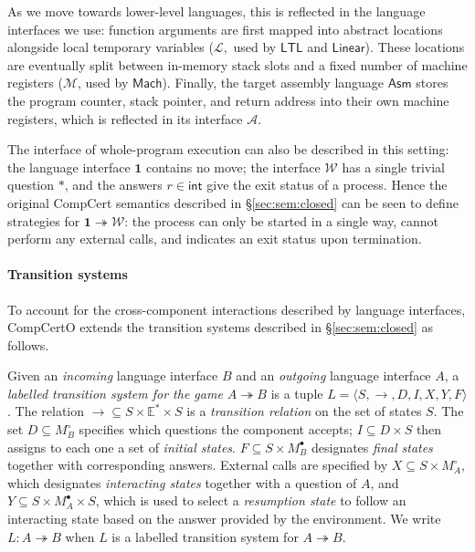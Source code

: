 \documentclass[acmsmall,authordraft]{acmart}
\newcommand{\kw}[1]{\ensuremath{ \mathsf{#1} }}
\newcommand{\que}{\circ}
\newcommand{\ans}{\bullet}
\begin{document}
As we move towards lower-level languages,
this is reflected in the language interfaces we use:
function arguments are first mapped into
abstract locations alongside local temporary variables
($\mathcal{L}$,~used by \kw{LTL} and \kw{Linear}).
These locations are eventually split between
in-memory stack slots and a fixed number of machine registers
($\mathcal{M}$, used by \kw{Mach}).
Finally, the target assembly language \kw{Asm}
stores the program counter, stack pointer,
and return address into their own machine registers,
which is reflected in its interface $\mathcal{A}$.

The interface of whole-program execution
can also be described in this setting:
the language interface $\mathbf{1}$ contains no move;
the interface $\mathcal{W}$ has a single trivial question $*$,
and the answers $r \in \kw{int}$
give the exit status of a process.
Hence the original CompCert semantics described in
\S\ref{sec:sem:closed}
can be seen to define strategies for
$\mathbf{1} \twoheadrightarrow \mathcal{W}$:
the process can only be started in a single way,
cannot perform any external calls,
and indicates an exit status upon termination.


\paragraph{Transition systems} %

To account for the cross-component interactions
described by language interfaces,
CompCertO extends
the transition systems described in \S\ref{sec:sem:closed}
as follows.

\begin{definition} \label{def:lts}
Given an \emph{incoming} language interface $B$
and an \emph{outgoing} language interface $A$,
a \emph{labelled transition system for the game $A \twoheadrightarrow B$}
is a tuple $L = \langle S, \rightarrow, D, I, X, Y, F \rangle$.
The relation
${\rightarrow} \subseteq S \times \mathbb{E}^* \times S$ is
a \emph{transition relation} on the set of states $S$.
The set $D \subseteq M_B^\que$ specifies which
questions the component accepts;
$I \subseteq D \times S$ then
assigns to each one a set of \emph{initial states}.
$F \subseteq S \times M_B^\ans$
designates \emph{final states} together with corresponding answers.
External calls are specified by
$X \subseteq S \times M_A^\que$,
which designates \emph{interacting states} together with
a question of $A$, and
$Y \subseteq S \times M_A^\ans \times S$,
which is used to select a \emph{resumption state}
to follow an interacting state
based on the answer provided by the environment.
We write $L : A \twoheadrightarrow B$ when
$L$ is a labelled transition system for $A \twoheadrightarrow B$.
\end{definition}
\end{document}
